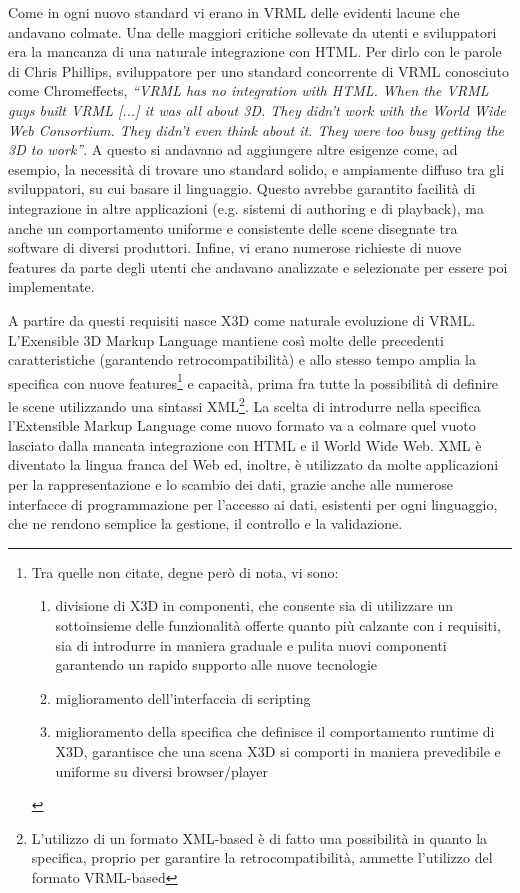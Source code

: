 Come in ogni nuovo standard vi erano in VRML delle evidenti lacune che andavano colmate. Una delle maggiori critiche sollevate da utenti e sviluppatori era la mancanza di una naturale integrazione con HTML. Per dirlo con le parole di Chris Phillips, sviluppatore per uno standard concorrente di VRML conosciuto come Chromeffects, \textit{``VRML has no integration with HTML. When the VRML guys built VRML [...] it was all about 3D. They didn't work with the World Wide Web Consortium. They didn't even think about it. They were too busy getting the 3D to work''}. A questo si andavano ad aggiungere altre esigenze come, ad esempio, la necessità di trovare uno standard solido, e ampiamente diffuso tra gli sviluppatori, su cui basare il linguaggio. Questo avrebbe garantito facilità di integrazione in altre applicazioni (e.g. sistemi di authoring e di playback), ma anche un comportamento uniforme e consistente delle scene disegnate tra software di diversi produttori. Infine, vi erano numerose richieste di nuove features da parte degli utenti che andavano analizzate e selezionate per essere poi implementate.

A partire da questi requisiti nasce X3D come naturale evoluzione di VRML. L'Exensible 3D Markup Language mantiene cos\`{i} molte delle precedenti caratteristiche (garantendo retrocompatibilità) e allo stesso tempo amplia la specifica con nuove features\footnote{Tra quelle non citate, degne però di nota,  vi sono:
\begin{enumerate} 
    \item divisione di X3D in componenti, che consente sia di utilizzare un sottoinsieme delle funzionalità offerte quanto più calzante con i requisiti, sia di introdurre in maniera graduale e pulita nuovi componenti garantendo un rapido supporto alle nuove tecnologie
    \item miglioramento dell'interfaccia di scripting
    \item miglioramento della specifica che definisce il comportamento runtime di X3D, garantisce che una scena X3D si comporti in maniera prevedibile e uniforme su diversi browser/player
\end{enumerate}} e capacità, prima fra tutte la possibilità di definire le scene utilizzando una sintassi XML\footnote{L'utilizzo di un formato XML-based è di fatto una possibilità in quanto la specifica, proprio per garantire la retrocompatibilità, ammette l'utilizzo del formato VRML-based}. La scelta di introdurre nella specifica l'Extensible Markup Language come nuovo formato va a colmare quel vuoto lasciato dalla mancata integrazione con HTML e il World Wide Web. XML è diventato la lingua franca del Web ed, inoltre, è utilizzato da molte applicazioni per la rappresentazione e lo scambio dei dati, grazie anche alle numerose interfacce di programmazione per l'accesso ai dati, esistenti per ogni linguaggio, che ne rendono semplice la gestione, il controllo e la validazione.

